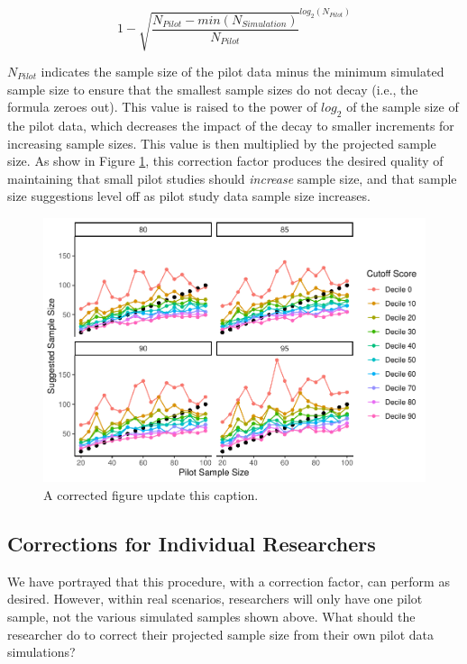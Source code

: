 \documentclass[
  man]{apa6}
\begin{document}
\[ 1 - \sqrt{\frac{N_{Pilot} - min(N_{Simulation})}{N_{Pilot}}}^{log_2(N_{Pilot})}\]

\(N_{Pilot}\) indicates the sample size of the pilot data minus the minimum simulated sample size to ensure that the smallest sample sizes do not decay (i.e., the formula zeroes out). This value is raised to the power of \(log_2\) of the sample size of the pilot data, which decreases the impact of the decay to smaller increments for increasing sample sizes. This value is then multiplied by the projected sample size. As show in Figure \ref{fig:corrected-figure}, this correction factor produces the desired quality of maintaining that small pilot studies should \emph{increase} sample size, and that sample size suggestions level off as pilot study data sample size increases.

\begin{figure}
\centering
\includegraphics{manuscript_draft_files/figure-latex/corrected-figure-1.pdf}
\caption{\label{fig:corrected-figure}A corrected figure update this caption.}
\end{figure}

\hypertarget{corrections-for-individual-researchers}{%
\subsection{Corrections for Individual Researchers}\label{corrections-for-individual-researchers}}

We have portrayed that this procedure, with a correction factor, can perform as desired. However, within real scenarios, researchers will only have one pilot sample, not the various simulated samples shown above. What should the researcher do to correct their projected sample size from their own pilot data simulations?
\end{document}
